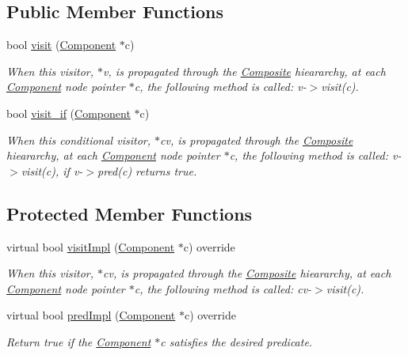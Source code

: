 \subsection*{Public Member Functions}
\begin{DoxyCompactItemize}
\item 
bool \hyperlink{classchem_1_1Visitor_a710015ef735e109c812edbb653d6d598}{visit} (\hyperlink{classchem_1_1Component}{Component} $\ast$c)
\begin{DoxyCompactList}\small\item\em When this visitor, $\ast$v, is propagated through the \hyperlink{classchem_1_1Composite}{Composite} hieararchy, at each \hyperlink{classchem_1_1Component}{Component} node pointer $\ast$c, the following method is called\-: v-\/$>$visit(c). \end{DoxyCompactList}\item 
bool \hyperlink{classchem_1_1Visitor_ad02a683bb0cf97d9df381c3efeb90a06}{visit\-\_\-if} (\hyperlink{classchem_1_1Component}{Component} $\ast$c)
\begin{DoxyCompactList}\small\item\em When this conditional visitor, $\ast$cv, is propagated through the \hyperlink{classchem_1_1Composite}{Composite} hieararchy, at each \hyperlink{classchem_1_1Component}{Component} node pointer $\ast$c, the following method is called\-: v-\/$>$visit(c), if v-\/$>$pred(c) returns true. \end{DoxyCompactList}\end{DoxyCompactItemize}
\subsection*{Protected Member Functions}
\begin{DoxyCompactItemize}
\item 
virtual bool \hyperlink{classchem_1_1CompositeVisitor_ac3104d5ec0d0628bbcc72f17f69b0396}{visit\-Impl} (\hyperlink{classchem_1_1Component}{Component} $\ast$c) override
\begin{DoxyCompactList}\small\item\em When this visitor, $\ast$cv, is propagated through the \hyperlink{classchem_1_1Composite}{Composite} hieararchy, at each \hyperlink{classchem_1_1Component}{Component} node pointer $\ast$c, the following method is called\-: cv-\/$>$visit(c). \end{DoxyCompactList}\item 
virtual bool \hyperlink{classchem_1_1CompositeVisitor_a157e17e7a6b7ed91b47d59aea1cc1268}{pred\-Impl} (\hyperlink{classchem_1_1Component}{Component} $\ast$c) override
\begin{DoxyCompactList}\small\item\em Return true if the \hyperlink{classchem_1_1Component}{Component} $\ast$c satisfies the desired predicate. \end{DoxyCompactList}\end{DoxyCompactItemize}


